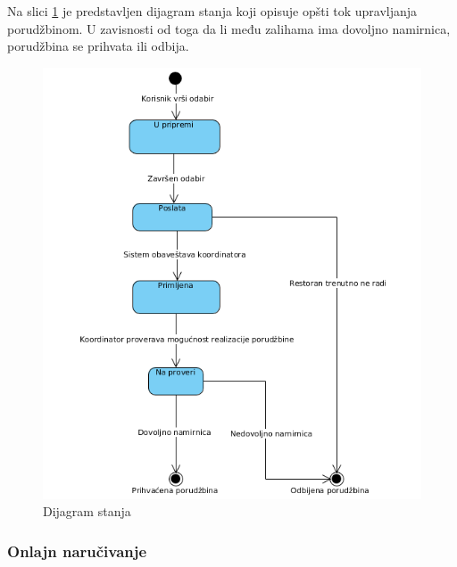Na slici \ref{fig:slika14} je predstavljen dijagram stanja koji opisuje opšti tok upra\-vljanja porudžbinom. U zavisnosti od toga da li među zalihama ima dovoljno namirnica, porudžbina se prihvata ili odbija.
\begin{figure}[!h]
    \leavevmode
    \begin{center}
    \includegraphics[height=0.6\textheight]{slike/Upravljanje_porudzbinom.png}
    \end{center}
    \caption{Dijagram stanja} %
    \label{fig:slika14}
\end{figure}
\subsubsection{Onlajn naručivanje}

